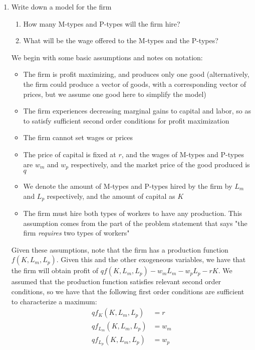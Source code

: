 \documentclass[12pt]{article}
\begin{document}
\begin{enumerate} 

	\item{Write down a model for the firm}
	
\begin{enumerate}

	\item{How many M-types and P-types will the firm hire?}
	\item{What will be the wage offered to the M-types and the P-types?}
	
\end{enumerate}

	We begin with some basic assumptions and notes on notation:
	
\begin{itemize}

	\item{The firm is profit maximizing, and produces only one good (alternatively, the firm could produce a vector of goods, with a corresponding vector of prices, but we assume one good here to simplify the model)}
	\item{The firm experiences decreasing marginal gains to capital and labor, so as to satisfy sufficient second order conditions for profit maximization}
	\item{The firm cannot set wages or prices}
	\item{The price of capital is fixed at $r$, and the wages of M-types and P-types are $w_m$ and $w_p$ respectively, and the market price of the good produced is $q$}
	\item{We denote the amount of M-types and P-types hired by the firm by $L_m$ and $L_p$ respectively, and the amount of capital as $K$}
	\item{The firm must hire both types of workers to have any production.  This assumption comes from the part of the problem statement that says "the firm \textit{requires} two types of workers"}
\end{itemize}

Given these assumptions, note that the firm has a production function $f(K,L_m,L_p)$.  Given this and the other exogeneous variables, we have that the firm will obtain profit of $q f(K,L_m,L_p) - w_m L_m - w_p L_p - rK$.  We assumed that the production function satisfies relevant second order conditions, so we have that the following first order conditions are sufficient to characterize a maximum:
\begin{align*}
q f_K(K, L_m, L_p) &= r \\
q f_{L_m}(K, L_m, L_p) &= w_m \\
q f_{L_p}(K, L_m, L_p) &= w_p \\
\end{align*}


\end{enumerate}
\end{document}
